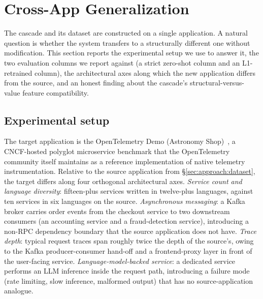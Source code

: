 %

\section{Cross-App Generalization}
\label{sec:cross-app}

The cascade and its dataset are constructed on a single application. A natural question is whether the system transfers to a structurally different one without modification. This section reports the experimental setup we use to answer it, the two evaluation columns we report against (a strict zero-shot column and an L1-retrained column), the architectural axes along which the new application differs from the source, and an honest finding about the cascade's structural-versus-value feature compatibility.

\subsection{Experimental setup}
\label{sec:cross-app:setup}

The target application is the OpenTelemetry Demo (Astronomy Shop)~\cite{otel-demo}, a CNCF-hosted polyglot microservice benchmark that the OpenTelemetry community itself maintains as a reference implementation of native telemetry instrumentation. Relative to the source application from \S\ref{sec:approach:dataset}, the target differs along four orthogonal architectural axes. \emph{Service count and language diversity}: fifteen-plus services written in twelve-plus languages, against ten services in six languages on the source. \emph{Asynchronous messaging}: a Kafka broker carries order events from the checkout service to two downstream consumers (an accounting service and a fraud-detection service), introducing a non-RPC dependency boundary that the source application does not have. \emph{Trace depth}: typical request traces span roughly twice the depth of the source's, owing to the Kafka producer-consumer hand-off and a frontend-proxy layer in front of the user-facing service. \emph{Language-model-backed service}: a dedicated service performs an LLM inference inside the request path, introducing a failure mode (rate limiting, slow inference, malformed output) that has no source-application analogue.

